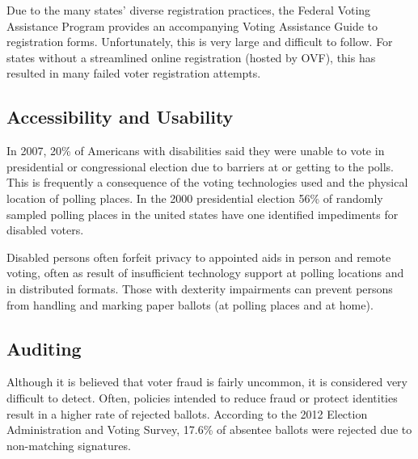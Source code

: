 
Due to the many states' diverse registration practices, the Federal Voting
Assistance Program provides an accompanying Voting Assistance Guide to
registration forms. Unfortunately, this is very large and difficult to follow.
For states without a streamlined online registration (hosted by OVF), this has
resulted in many failed voter registration attempts.


\subsection{Accessibility and Usability}

In 2007, 20\% of Americans with disabilities said they were unable to vote in
presidential or congressional election due to barriers at or getting to the
polls. This is frequently a consequence of the voting technologies used and the
physical location of polling places. In the 2000 presidential election 56\% of
randomly sampled polling places in the united states have one identified
impediments for disabled voters.

Disabled persons often forfeit privacy to appointed aids in person and remote
voting, often as result of insufficient technology support at polling locations
and in distributed formats. Those with dexterity impairments can prevent
persons from handling and marking paper ballots (at polling places and at
home).


\subsection{Auditing}
Although it is believed that voter fraud is fairly uncommon, it is considered
very difficult to detect. Often, policies intended to reduce fraud or protect
identities result in a higher rate of rejected ballots. According to the 2012
Election Administration and Voting Survey, 17.6\% of absentee ballots were
rejected due to non-matching signatures.

